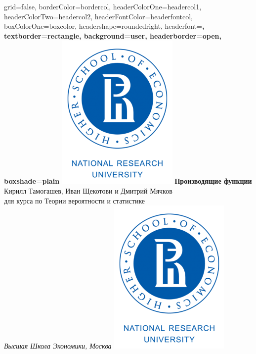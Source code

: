 \documentclass[a0paper,portrait]{baposter}
\begin{document}

\begin{poster}{
grid=false,
borderColor=bordercol, %
headerColorOne=headercol1, %
headerColorTwo=headercol2, %
headerFontColor=headerfontcol, %
boxColorOne=boxcolor, %
headershape=roundedright, %
headerfont=\Large\sf\bf, %
textborder=rectangle,
background=user,
headerborder=open, %
boxshade=plain
}
{\includegraphics[scale=0.45]{hse1.png}}
%
%
{ \bf  \huge {Производящие функции} }
{\vspace{0.3em} \smaller Кирилл Тамогашев, Иван Щекотови и Дмитрий Мячков \\для курса по Теории вероятности и статистике\\  %
  
\smaller \it{Высшая Школа Экономики, Москва}} %
{\includegraphics[scale=0.45]{hse1.png}} %


\end{poster}
\end{document}
